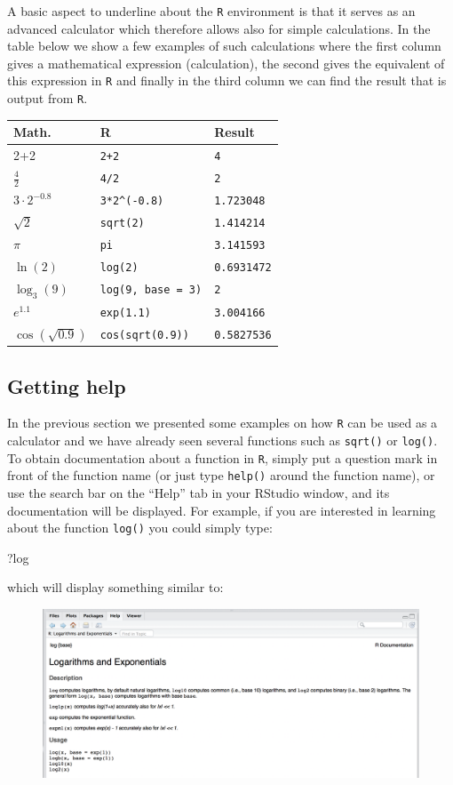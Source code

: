 \documentclass[]{book}
\newenvironment{Shaded}{\begin{snugshade}}{\end{snugshade}}
\newcommand{\NormalTok}[1]{{#1}}
\theoremstyle{definition}
\theoremstyle{definition}
\theoremstyle{remark}
\begin{document}
A basic aspect to underline about the \texttt{R} environment is that it
serves as an advanced calculator which therefore allows also for simple
calculations. In the table below we show a few examples of such
calculations where the first column gives a mathematical expression
(calculation), the second gives the equivalent of this expression in
\texttt{R} and finally in the third column we can find the result that
is output from \texttt{R}.

\begin{longtable}[]{@{}lll@{}}
\toprule
Math. & R & Result\tabularnewline
\midrule
\endhead
2+2 & \texttt{2+2} & \texttt{4}\tabularnewline
\(\frac{4}{2}\) & \texttt{4/2} & \texttt{2}\tabularnewline
\(3 \cdot 2^{-0.8}\) & \texttt{3*2\^{}(-0.8)} &
\texttt{1.723048}\tabularnewline
\(\sqrt{2}\) & \texttt{sqrt(2)} & \texttt{1.414214}\tabularnewline
\(\pi\) & \texttt{pi} & \texttt{3.141593}\tabularnewline
\(\ln(2)\) & \texttt{log(2)} & \texttt{0.6931472}\tabularnewline
\(\log_{3}(9)\) & \texttt{log(9,\ base\ =\ 3)} &
\texttt{2}\tabularnewline
\(e^{1.1}\) & \texttt{exp(1.1)} & \texttt{3.004166}\tabularnewline
\(\cos(\sqrt{0.9})\) & \texttt{cos(sqrt(0.9))} &
\texttt{0.5827536}\tabularnewline
\bottomrule
\end{longtable}

\subsection{Getting help}\label{getting-help}

In the previous section we presented some examples on how \texttt{R} can
be used as a calculator and we have already seen several functions such
as \texttt{sqrt()} or \texttt{log()}. To obtain documentation about a
function in \texttt{R}, simply put a question mark in front of the
function name (or just type \texttt{help()} around the function name),
or use the search bar on the ``Help'' tab in your RStudio window, and
its documentation will be displayed. For example, if you are interested
in learning about the function \texttt{log()} you could simply type:

\begin{Shaded}
\begin{Highlighting}[]
\NormalTok{?log}
\end{Highlighting}
\end{Shaded}

which will display something similar to:

\begin{figure}[htbp]
\centering
\includegraphics{images/example-log-help.png}
\caption{}
\end{figure}
\end{document}
